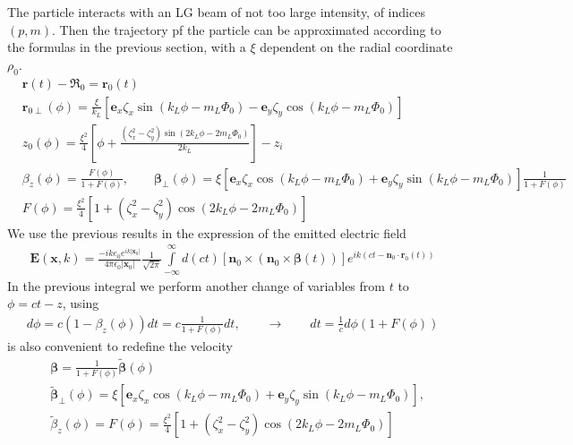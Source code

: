 The particle interacts with an LG beam of not too large intensity, of indices $(p,m)$. Then the trajectory pf the particle can be approximated according to the formulas in the previous section, with a $\xi$ dependent on the radial coordinate $\rho_0$.
\begin{align}
     & {\bm r}(t) -{\boldsymbol{\mathfrak R}}_0={\bm r}_0(t)\nonumber                                                                                                                                           \\
     & {\bm r}_{0\perp}(\phi)=\frac{\xi}{k_L}\left[{\bm e}_x\zeta_x\sin(k_L\phi-m_L\varPhi_0)-{\bm e}_y\zeta_y\cos(k_L\phi-m_L\varPhi_0)\right]                                                                 \\
     & z_0(\phi)=\frac{\xi^2}4\left[\phi+\frac{(\zeta_x^2-\zeta_y^2)\sin(2k_L\phi-2m_L\varPhi_0)}{2k_L}\right] -z_i                                                                                             \\
     & \beta_z(\phi) =\frac{F(\phi)}{1+F(\phi)},\qquad  {\boldsymbol{\beta}}_\perp(\phi)=\xi\left[{\bm e}_x\zeta_x\cos(k_L\phi-m_L\varPhi_0)+{\bm e}_y\zeta_y\sin(k_L\phi-m_L\varPhi_0)\right]\frac1{1+F(\phi)} \\
     & F(\phi) = \frac{\xi^2}4\left[1+(\zeta_x^2-\zeta_y^2)\cos(2k_L\phi-2m_L\varPhi_0)\right]
\end{align}
We use the previous results in the expression of the emitted electric field
\begin{align}
    {\bm E}({\bm x},k) =\frac{-i k e_0 e^{ik |{\bm x}_0|}}{4\pi\epsilon_0|{\bm x}_0|}\frac1{\sqrt{2\pi}}\int\limits_{-\infty}^{\infty}d(ct)\left[{{\bm n}_0\times({\bm n}_0\times{\boldsymbol\beta}(t))}\right]e^{ik(ct-{\bm n}_0\cdot{\bm r}_0(t))}
\end{align}
In the previous integral we perform another change of variables from $t$ to $\phi=ct-z$, using
\begin{align}
    d\phi = c (1-\beta_z(\phi)) dt = c\frac1{1+F(\phi)} dt,\qquad \rightarrow \qquad dt=\frac1c d\phi(1+F(\phi))
\end{align}
is also convenient to redefine the velocity
\begin{align}
     & {\boldsymbol{\beta}} = \frac1{1+F(\phi)}\tilde{\boldsymbol{\beta}}(\phi)                                                                       \\
     & \tilde{\boldsymbol{\beta}}_\perp(\phi) =\xi\left[{\bm e}_x\zeta_x\cos(k_L\phi-m_L\varPhi_0)+{\bm e}_y\zeta_y\sin(k_L\phi-m_L\varPhi_0)\right], \\
     & \tilde\beta_z(\phi) =F(\phi)=\frac{\xi^2}4\left[1+(\zeta_x^2-\zeta_y^2)\cos(2k_L\phi-2m_L\varPhi_0)\right]
\end{align}
